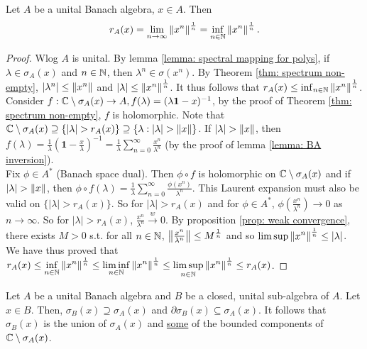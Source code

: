 \documentclass{article}
\begin{document}
\begin{theorem}\label{thm: Beurling-Gelfand SRF}
    Let $A$ be a unital Banach algebra, $x\in A$. Then 
    $$
    r_A(x) = \displaystyle\lim_{n\to \infty}\left\lVert x^n\right\rVert^{\frac{1}{n}}=\inf_{n\in \mathbb{N}}\left\lVert x^n\right\rVert^{\frac{1}{n}}.
    $$
\end{theorem}

\begin{proof}
    Wlog $A$ is unital. By lemma \ref{lemma: spectral mapping for polys}, if $\lambda\in \sigma_A(x)$ and $n\in \mathbb{N}$, then $\lambda^n\in \sigma(x^n)$. By Theorem \ref{thm: spectrum non-empty}, $|\lambda^n|\leq \left\lVert x^n\right\rVert$ and $|\lambda|\leq \left\lVert x^n\right\rVert^{\frac{1}{n}}$. It thus follows that $r_A(x)\leq \inf_{n\in \mathbb{N}}\left\lVert x^n\right\rVert^{\frac{1}{n}}$.\\

    Consider $f:\mathbb{C}\setminus \sigma_A(x)\to A, f(\lambda) = (\lambda\mathbf{1}-x)^{-1}$, by the proof of Theorem \ref{thm: spectrum non-empty}, $f$ is holomorphic. Note that $\C\setminus\sigma_A(x)\supseteq \{|\lambda|>r_A(x)\}\supseteq\{\lambda: |\lambda|>\norm{x}\}$. If $|\lambda|>\norm{x}$, then $f(\lambda) = \frac{1}{\lambda}\left(\mathbf{1}-\frac{x}{\lambda}\right)^{-1}=\frac{1}{\lambda}\displaystyle\sum^\infty_{n=0}\frac{x^n}{\lambda^n}$ (by the proof of lemma \ref{lemma: BA inversion}).\\

    Fix $\phi\in A^*$ (Banach space dual). Then $\phi\circ f$ is holomorphic on $\mathbb{C}\setminus\sigma_A(x)$ and if $|\lambda|>\norm{x}$, then $\phi\circ f(\lambda)=\frac{1}{\lambda}\displaystyle\sum^\infty_{n=0}\frac{\phi(x^n)}{\lambda^n}$. This Laurent expansion must also be valid on $\{|\lambda|>r_A(x)\}$. So for $|\lambda|>r_A(x)$ and for $\phi\in A^*$, $\phi\left(\frac{x^n}{\lambda^n}\right)\to 0$ as $n\to \infty$. So for $|\lambda|>r_A(x)$, $\frac{x^n}{\lambda^n}\xrightarrow{w}0$. By proposition \ref{prop: weak convergence}, there exists $M>0$ s.t. for all $n\in \mathbb{N}$, $\left\lVert\frac{x^n}{\lambda^n}\right\rVert\leq M^{\frac{1}{n}}$ and so $\displaystyle\limsup\left\lVert x^n\right\rVert^{\frac{1}{n}}\leq |\lambda|$. We have thus proved that 
    $r_A(x)\leq \displaystyle\inf_{n\in \mathbb{N}}\left\lVert x^n\right\rVert^{\frac{1}{n}}\leq \liminf_{n\in \mathbb{N}}\left\lVert x^n\right\rVert^{\frac{1}{n}}\leq \limsup_{n\in \mathbb{N}}\left\lVert x^n\right\rVert^{\frac{1}{n}}\leq r_A(x)$.
\end{proof}

\begin{theorem}\label{thm: topological property of spectrum}
Let $A$ be a unital Banach algebra and $B$ be a closed, unital sub-algebra of $A$. Let $x\in B$. Then, $\sigma_B(x)\supseteq \sigma_A(x)$ and $\partial\sigma_B(x)\subseteq \sigma_A(x)$. It follows that $\sigma_B(x)$ is the union of $\sigma_A(x)$ and \noindent\underline{some} of the bounded components of $\mathbb{C}\setminus\sigma_A(x)$.
\end{theorem}
\end{document}
